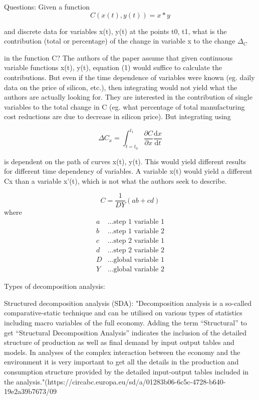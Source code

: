 \documentclass{article}
\begin{document}
Questions:
Given a function
\begin{equation}
    C(x(t), y(t)) = x * y
\end{equation}

and discrete data for variables x(t), y(t) at the points t0, t1, what is the contribution
(total or percentage) of the change in variable x to the change $\Delta_C$

in the function C?
The authors of the paper assume that given continuous variable functions x(t), y(t), equation
(1) would suffice to calculate the contributions. But even if the time dependence
of variables were known (eg. daily data on the price of silicon, etc.), then integrating
would not yield what the authors are actually looking for.
They are interested in the contribution of single variables to the total change in C (eg.
what percentage of total manufacturing cost reductions are due to decrease in silicon
price). But integrating using

\begin{equation}
    \Delta C_x = \int_{t=t_0}^{t_1} \frac{\partial C}{\partial x} \frac{\text{d}x}{\text{d}t}
\end{equation}

is dependent on the path of curves x(t), y(t). This would yield different results for different
time dependency of variables. A variable x(t) would yield a different Cx than a
variable x'(t), which is not what the authors seek to describe.

%
\begin{equation}
    C = \frac{1}{DY}(ab+cd)
\end{equation}
%
where
%
\begin{align*}
    a &\dots \text{step 1 variable 1} \\
    b &\dots \text{step 1 variable 2} \\
    c &\dots \text{step 2 variable 1} \\
    d &\dots \text{step 2 variable 2} \\
    D &\dots \text{global variable 1} \\
    Y &\dots \text{global variable 2}
\end{align*}
%

\clearpage

Types of decomposition analysis:

Structured decomposition analysis (SDA): "Decomposition analysis is a so-called comparative-static technique and can be utilised
on various types of statistics including macro variables of the full economy. Adding the term “Structural” to get “Structural Decomposition Analysis” indicates the inclusion of the detailed structure of production as well as final demand by input output tables and models. In analyses of the complex interaction between the economy and the environment it is very important to get all the details in the production and consumption structure provided by the detailed input-output tables included in the analysis."(https://circabc.europa.eu/sd/a/01283b06-6c5c-4728-b640-19e2a39b7673/09%

\clearpage
\printbibliography
\end{document}

